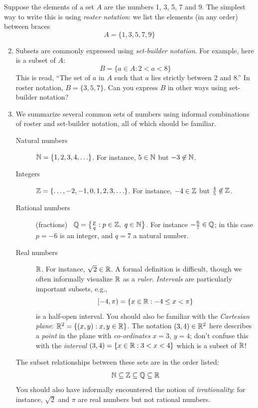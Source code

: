 \begin{examples}{}{}
	\exstart Suppose the elements of a set $A$ are the numbers 1, 3, 5, 7 and 9. The simplest way to write this is using \emph{roster notation}: we list the elements (in any order) between braces
	\[
		A=\{1,3,5,7,9\}
	\]
	\begin{enumerate}\setcounter{enumi}{1}
	  \item[]Subsets are commonly expressed using \emph{set-builder notation}. %
	  For example, here is a subset of $A$:
	 	\[
	 		B=\{a\in A:2<a<8\} %
	 	\]
	 	This is read, ``The set of $a$ in $A$ such that $a$ lies strictly between 2 and 8.'' In roster notation, $B=\{3,5,7\}$. Can you express $B$ in other ways using set-builder notation?
	 	
	  \goodbreak
  
	  \item We summarize several common sets of numbers using informal combinations of roster and set-builder notation, all of which should be familiar.
	  \begin{description}
			\item[Natural numbers] $\mathbb{N}=\{1,2,3,4,\ldots\}$. For instance, $5\in\mathbb{N}$ but $-3\not\in\mathbb{N}$.
			\item[Integers] $\mathbb{Z}=\{\ldots,-2,-1,0,1,2,3,\ldots\}$. For instance, $-4\in\mathbb{Z}$ but $\frac 45\not\in\mathbb{Z}$.
			\item[Rational numbers] (fractions) \ $\Q=\bigl\{\frac pq:p\in\Z,\ q\in\N\bigr\}$. For instance $-\frac 67\in\mathbb{Q}$; in this case $p=-6$ is an integer, and $q=7$ a natural number.
			\item[Real numbers] $\mathbb{R}$. For instance, $\sqrt 2\in\mathbb{R}$. A formal definition is difficult, though we often informally visualize $\mathbb{R}$ as a \emph{ruler}. \emph{Intervals} are particularly important subsets, e.g.,
			\[
				[-4,\pi)=\{x\in\mathbb{R}:-4\le x<\pi\}
			\]
			is a half-open interval.\smallbreak
			You should also be familiar with the \emph{Cartesian plane}: $\mathbb{R}^2=\{(x,y):x,y\in\mathbb{R}\}$. The notation $(3,4)\in\mathbb{R}^2$ here describes a \emph{point} in the plane with \emph{co-ordinates} $x=3$, $y=4$; don't confuse this with the \emph{interval} $(3,4)=\{x\in\mathbb{R}:3<x<4\}$ which is a subset of $\mathbb{R}$!
		\end{description}
		The subset relationships between these sets are in the order listed:
		\[
			\mathbb{N}\subseteq\mathbb{Z}\subseteq\mathbb{Q}\subseteq\mathbb{R}
		\]
		You should also have informally encountered the notion of \emph{irrationality}: for instance, $\sqrt 2$ and $\pi$ are real numbers but not rational numbers.
	\end{enumerate}
\end{examples}

